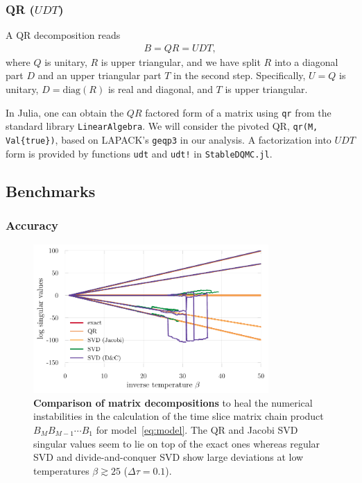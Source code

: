 \documentclass[submission, Phys]{SciPost}
\begin{document}
\subsubsection{QR ($UDT$)}
A QR decomposition reads
\begin{align}
	B = QR = UDT,
\end{align}
where $Q$ is unitary, $R$ is upper triangular, and we have split $R$ into a diagonal part $D$ and an upper triangular part $T$ in the second step. Specifically, $U = Q$ is unitary, $D = \textrm{diag}(R)$ is real and diagonal, and $T$ is upper triangular.

In Julia, one can obtain the $QR$ factored form of a matrix using \texttt{qr} from the standard library \texttt{LinearAlgebra}. We will consider the pivoted QR, \texttt{qr(M, Val\{true\})}, based on LAPACK's \texttt{geqp3} in our analysis. A factorization into $UDT$ form is provided by functions \texttt{udt} and \texttt{udt!} in \texttt{StableDQMC.jl}.


\subsection{Benchmarks}

\subsubsection{Accuracy}
\begin{figure}
	\centering
	\includegraphics[width=0.8\textwidth]{figures/decomp_comparison_simple.pdf}
	\caption{\textbf{Comparison of matrix decompositions} to heal the numerical instabilities in the calculation of the time slice matrix chain product $B_M B_{M-1} \cdots B_1$ for model~\eqref{eq:model}. The QR and Jacobi SVD singular values seem to lie on top of the exact ones whereas regular SVD and divide-and-conquer SVD show large deviations at low temperatures $\beta \gtrsim 25$ ($\Delta \tau = 0.1$).}
	\label{fig:decomp_comparison_simple}
\end{figure}
\end{document}

